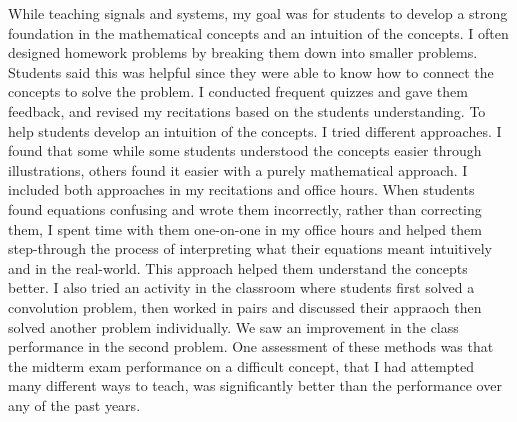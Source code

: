 \documentclass[10pt]{article}
\begin{document}
While teaching signals and systems, my goal was for students to develop a strong foundation in the mathematical concepts and an intuition of the concepts. 
I often designed homework problems by breaking them down into smaller problems. Students said this was helpful since they were able to know how to connect the concepts to solve the problem. %
I conducted frequent quizzes and gave them feedback, and revised my recitations based on the students understanding. %
To help students develop an intuition of the concepts. I tried different approaches. %
I found that some while some students understood the concepts easier through illustrations, others found it easier with a purely mathematical approach. I included both approaches in my recitations and office hours. 
When students found equations confusing and wrote them incorrectly, rather than correcting them, I spent time with them one-on-one in my office hours and helped them step-through the process of interpreting what their equations meant intuitively and in the real-world. This approach helped them understand the concepts better. 
I also tried an activity in the classroom where students first solved a convolution problem, then worked in pairs and discussed their appraoch then solved another problem individually. We saw an improvement in the class performance in the second problem. One assessment of these methods was that the midterm exam performance on a difficult concept, that I had attempted many different ways to teach, was significantly better than the performance over any of the past years. \\
\end{document}
